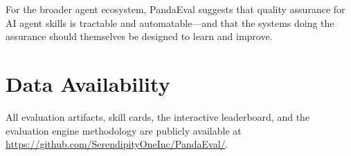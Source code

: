 \documentclass[11pt,a4paper]{article}
\begin{document}
For the broader agent ecosystem, PandaEval suggests that quality assurance for AI agent skills is tractable and automatable---and that the systems doing the assurance should themselves be designed to learn and improve.

\section*{Data Availability}

All evaluation artifacts, skill cards, the interactive leaderboard, and the evaluation engine methodology are publicly available at \url{https://github.com/SerendipityOneInc/PandaEval/}. 

\end{document}
